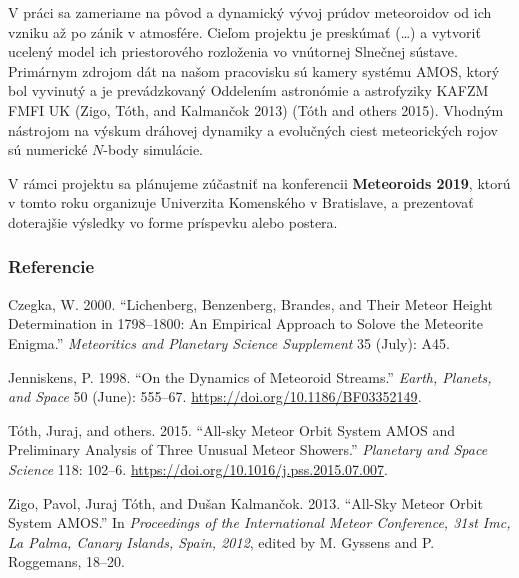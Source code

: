 V práci sa zameriame na pôvod a dynamický vývoj prúdov meteoroidov od
ich vzniku až po zánik v atmosfére. Cieľom projektu je preskúmať
(\ldots{}) a vytvoriť ucelený model ich priestorového rozloženia vo
vnútornej Slnečnej sústave. Primárnym zdrojom dát na našom pracovisku sú
kamery systému AMOS, ktorý bol vyvinutý a je prevádzkovaný Oddelením
astronómie a astrofyziky KAFZM FMFI UK (Zigo, Tóth, and Kalmančok 2013)
(Tóth and others 2015). Vhodným nástrojom na výskum dráhovej dynamiky a
evolučných ciest meteorických rojov sú numerické \(N\)-body simulácie.

V rámci projektu sa plánujeme zúčastniť na konferencii
\textbf{Meteoroids 2019}, ktorú v tomto roku organizuje Univerzita
Komenského v Bratislave, a prezentovať doterajšie výsledky vo forme
príspevku alebo postera.

\subsubsection*{Referencie}\label{referencie}

\hypertarget{refs}{}
\hypertarget{ref-czegka2000}{}
Czegka, W. 2000. ``Lichenberg, Benzenberg, Brandes, and Their Meteor
Height Determination in 1798--1800: An Empirical Approach to Solove the
Meteorite Enigma.'' \emph{Meteoritics and Planetary Science Supplement}
35 (July): A45.

\hypertarget{ref-jenniskens1998}{}
Jenniskens, P. 1998. ``On the Dynamics of Meteoroid Streams.''
\emph{Earth, Planets, and Space} 50 (June): 555--67.
\url{https://doi.org/10.1186/BF03352149}.

\hypertarget{ref-toth2015}{}
Tóth, Juraj, and others. 2015. ``All-sky Meteor Orbit System AMOS and
Preliminary Analysis of Three Unusual Meteor Showers.'' \emph{Planetary
and Space Science} 118: 102--6.
\url{https://doi.org/10.1016/j.pss.2015.07.007}.

\hypertarget{ref-zigo2013}{}
Zigo, Pavol, Juraj Tóth, and Dušan Kalmančok. 2013. ``All-Sky Meteor
Orbit System AMOS.'' In \emph{Proceedings of the International Meteor
Conference, 31st Imc, La Palma, Canary Islands, Spain, 2012}, edited by
M. Gyssens and P. Roggemans, 18--20.

